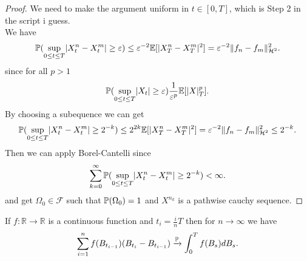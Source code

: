 \begin{proof}
We need to make the argument uniform in $t \in  [0,T]$, which is Step 2 in the script i guess.\\[1ex]
We have
\begin{align*}
  \P(\sup_{0\le t\le T} \abs{X_t^n - X_t^m} \ge  \epsilon)  \le  \epsilon^{-2} \E[\abs{X_T^n - X_T^m}^2] = \epsilon^{-2} \|f_n-f_m\|^2_{\mathcal{H}^2}
.\end{align*}
since  for all $p>1$
\begin{align*}
  \P(\sup_{0\le t\le T} \abs{X_t} \ge  \epsilon) \frac{1}{\epsilon^p} \E[\abs{X}_T^p]
.\end{align*}
By choosing a subequence we can get 
\begin{align*}
  \P(\sup_{0\le t\le T} \abs{X_t^n - X_t^m} \ge  2^{-k} )  \le  2^{2k} \E[\abs{X_T^n - X_T^m}^2] = \epsilon^{-2} \|f_n-f_m\|^2_{\mathcal{H}^2} \le  2^{-k} 
.\end{align*}
Then we can apply Borel-Cantelli since
\begin{align*}
  \sum_{k=0}^{\infty}   \P(\sup_{0\le t\le T} \abs{X_t^n - X_t^m} \ge  2^{-k} ) < \infty
.\end{align*}
and get $\Omega_0 \in  \mathcal{F}$ such that $\P(\Omega_0) = 1$ and $X^{n_k} $ is a pathwise cauchy sequence.
\end{proof}
\begin{Theorem}
 If $f : \mathbb{R} \to \mathbb{R} $  is a continuous function and  $t_i = \frac{i}{n}T$ then for $n\to \infty$ we have
 \begin{align*}
   \sum_{i=1}^{n} f(B_{t_{i-1}})(B_{t_i}-B_{t_{i-1}}) \xrightarrow{\P} \int_0^{T} f(B_s) dB_s
 .\end{align*}
\end{Theorem}
